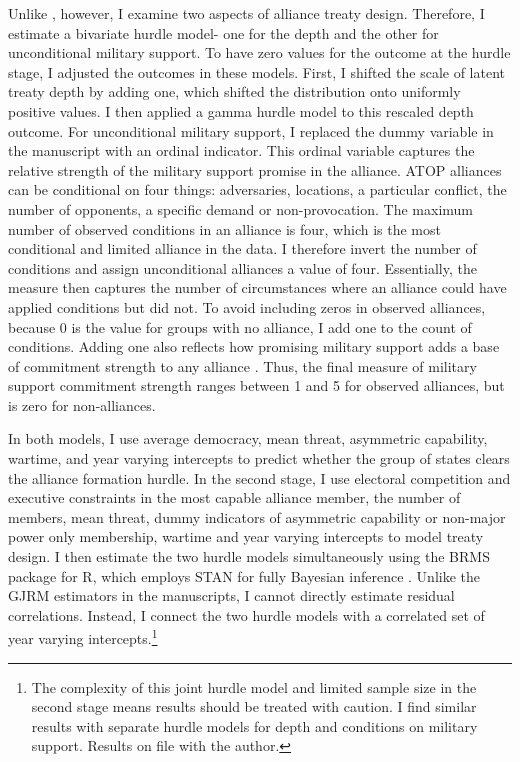 \documentclass[12pt]{article}
\begin{document}
Unlike \citet{Chibaetal2015}, however, I examine two aspects of alliance treaty design. 
Therefore, I estimate a bivariate hurdle model- one for the depth and the other for unconditional military support. 
To have zero values for the outcome at the hurdle stage, I adjusted the outcomes in these models. 
First, I shifted the scale of latent treaty depth by adding one, which shifted the distribution onto uniformly positive values. 
I then applied a gamma hurdle model to this rescaled depth outcome.  
For unconditional military support, I replaced the dummy variable in the manuscript with an ordinal indicator.
This ordinal variable captures the relative strength of the military support promise in the alliance. 
ATOP alliances can be conditional on four things: adversaries, locations, a particular conflict, the number of opponents, a specific demand or non-provocation. 
The maximum number of observed conditions in an alliance is four, which is the most conditional and limited alliance in the data. 
I therefore invert the number of conditions and assign unconditional alliances a value of four. 
Essentially, the measure then captures the number of circumstances where an alliance could have applied conditions but did not. 
To avoid including zeros in observed alliances, because 0 is the value for groups with no alliance, I add one to the count of conditions.
Adding one also reflects how promising military support adds a base of commitment strength to any alliance \citep{Morrow2000}. 
Thus, the final measure of military support commitment strength ranges between 1 and 5 for observed alliances, but is zero for non-alliances. 


In both models, I use average democracy, mean threat, asymmetric capability, wartime, and year varying intercepts to predict whether the group of states clears the alliance formation hurdle.
In the second stage, I use electoral competition and executive constraints in the most capable alliance member, the number of members, mean threat, dummy indicators of asymmetric capability or non-major power only membership, wartime and year varying intercepts to model treaty design. 
I then estimate the two hurdle models simultaneously using the BRMS package for \textsf{R}, which employs STAN for fully Bayesian inference \citep{Buerkner2017}. 
Unlike the GJRM estimators in the manuscripts, I cannot directly estimate residual correlations.
Instead, I connect the two hurdle models with a correlated set of year varying intercepts.\footnote{The complexity of this joint hurdle model and limited sample size in the second stage means results should be treated with caution. I find similar results with separate hurdle models for depth and conditions on military support. Results on file with the author.} 
\end{document}
